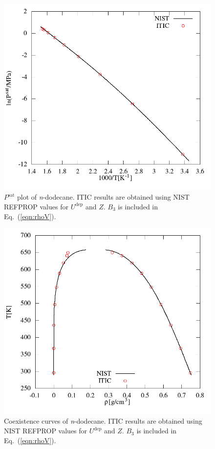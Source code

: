 \documentclass[%
 aip,
 jcp,
 sd,%
 amsmath,amssymb,
 reprint,%
]{revtex4-1}
\begin{document}
\begin{figure} 
\includegraphics[scale=0.4]{Figures/NIST-VAL_FTT_psat.png}
\caption{$P^{\mathrm{sat}}$ plot of \textit{n}-dodecane. ITIC results are obtained using NIST REFPROP values \cite{Lemmon2004} for $U^{\mathrm{dep}}$ and $Z$. $B_3$ is included in Eq.~(\ref{eqn:rhoV}).}
\label{fig:NIST-VALIDATION_C12_FTT_Psat}
\end{figure}

\begin{figure}
\includegraphics[scale=0.4]{Figures/NIST-VAL_FTT_trho.png}
\caption{Coexistence curves of \textit{n}-dodecane. ITIC results are obtained using NIST REFPROP values \cite{Lemmon2004} for $U^{\mathrm{dep}}$ and $Z$. $B_3$ is included in Eq.~(\ref{eqn:rhoV}).}
\label{fig:NIST-VAL-C12-FTT_BINODAL}
\end{figure}
\end{document}
